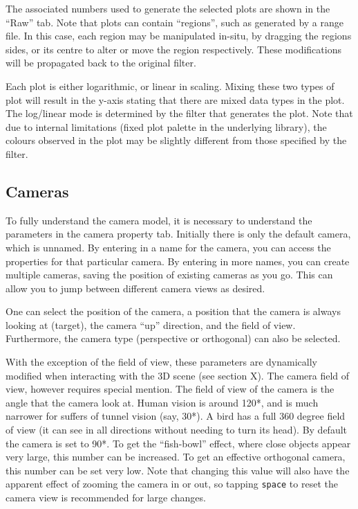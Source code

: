\documentclass[10pt]{article}
\begin{document}
The associated numbers used to generate the selected plots are shown in the ``Raw'' tab. Note that plots can contain ``regions'', such as generated by a range file. In this case, each region may be manipulated in-situ, by dragging the regions sides, or its centre to alter or move the region respectively. These modifications will be propagated back to the original filter.

Each plot is either logarithmic, or linear in scaling. Mixing these two types of plot will result in the y-axis stating that there are mixed data types in the plot. The log/linear mode is determined by the filter that generates the plot. Note that due to internal limitations (fixed plot palette in the underlying library), the colours observed in the plot may be slightly different from those specified by the filter.

\subsection{Cameras}
To fully understand the camera model, it is necessary to understand the parameters in the camera property tab. Initially there is only the default camera, which is unnamed. By entering in a name for the camera, you can access the properties for that particular camera. By entering in more names, you can create multiple cameras, saving the position of existing cameras as you go. This can allow you to jump between different camera views as desired.

One can select the position of the camera, a position that the camera is always looking at (target), the camera ``up'' direction, and the field of view. Furthermore, the camera type (perspective or orthogonal) can also be selected.

With the exception of the field of view, these parameters are dynamically modified when interacting with the 3D scene (see section X). The camera field of view, however requires special mention. The field of view of the camera is the angle that the camera look at. Human vision is around 120*, and is much narrower for suffers of tunnel vision (say, 30*). A bird has a full 360 degree field of view (it can see in all directions without needing to turn its head). By default the camera is set to 90*. To get the ``fish-bowl'' effect, where close objects appear very large, this number can be increased. To get an effective orthogonal camera, this number can be set very low. Note that changing this value will also have the apparent effect of zooming the camera in or out, so tapping \texttt{space} to reset the camera view is recommended for large changes. 
\end{document}
